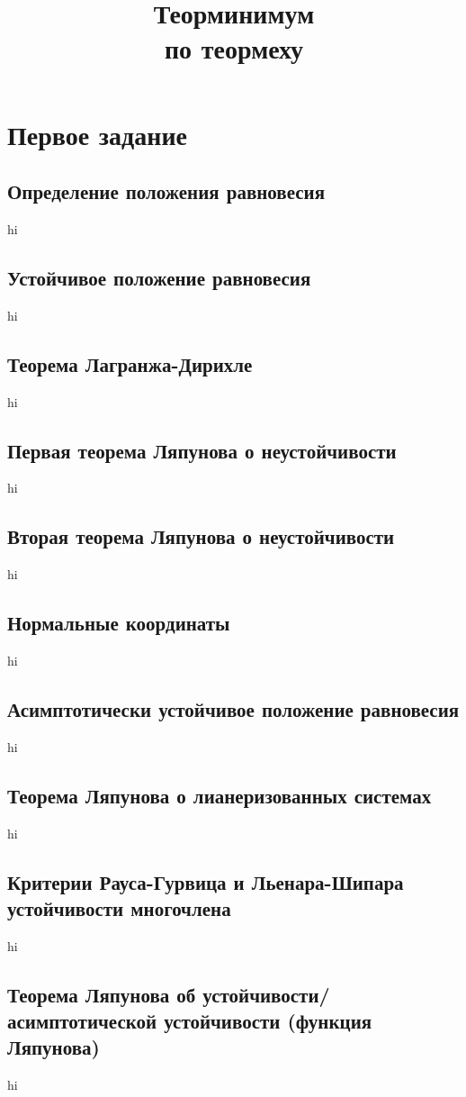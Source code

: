 \documentclass[a4paper,12pt]{article}
\title{Теорминимум \\
по теормеху}
\begin{document}
%
\maketitle
\section*{Первое задание}
\subsection{Определение положения равновесия}
hi
\subsection{Устойчивое положение равновесия}
hi
\subsection{Теорема Лагранжа-Дирихле}
hi
\subsection{Первая теорема Ляпунова о неустойчивости}
hi
\subsection{Вторая теорема Ляпунова о неустойчивости}
hi
\subsection{Нормальные координаты}
hi
\subsection{Асимптотически устойчивое положение равновесия}
hi
\subsection{Теорема Ляпунова о лианеризованных системах}
hi
\subsection{Критерии Рауса-Гурвица и Льенара-Шипара устойчивости многочлена}
hi
\subsection{Теорема Ляпунова об устойчивости/асимптотической устойчивости
(функция Ляпунова)}
hi
\end{document}

